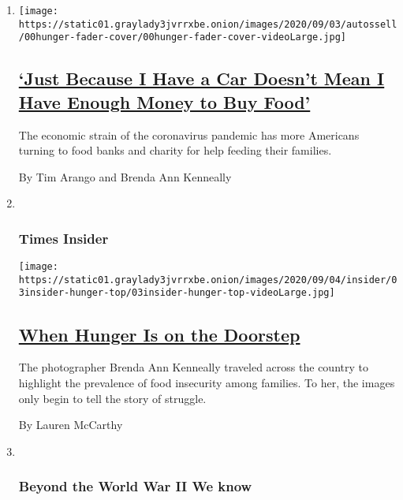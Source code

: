 \begin{enumerate}
\def\labelenumi{\arabic{enumi}.}
\item
  \texttt{[image: https://static01.graylady3jvrrxbe.onion/images/2020/09/03/autossell/00hunger-fader-cover/00hunger-fader-cover-videoLarge.jpg]}

  \hypertarget{just-because-i-have-a-car-doesnt-mean-i-have-enough-money-to-buy-food}{%
  \subsection{\texorpdfstring{\href{/2020/09/03/us/food-pantries-hunger-us.html}{`Just
  Because I Have a Car Doesn't Mean I Have Enough Money to Buy
  Food'}}{`Just Because I Have a Car Doesn't Mean I Have Enough Money to Buy Food'}}\label{just-because-i-have-a-car-doesnt-mean-i-have-enough-money-to-buy-food}}

  The economic strain of the coronavirus pandemic has more Americans
  turning to food banks and charity for help feeding their families.

  By Tim Arango and Brenda Ann Kenneally
\item ~
  \hypertarget{times-insider}{%
  \subsubsection{Times Insider}\label{times-insider}}

  \texttt{[image: https://static01.graylady3jvrrxbe.onion/images/2020/09/04/insider/03insider-hunger-top/03insider-hunger-top-videoLarge.jpg]}

  \hypertarget{when-hunger-is-on-the-doorstep}{%
  \subsection{\texorpdfstring{\href{/2020/09/02/insider/food-insecurity-families.html}{When
  Hunger Is on the
  Doorstep}}{When Hunger Is on the Doorstep}}\label{when-hunger-is-on-the-doorstep}}

  The photographer Brenda Ann Kenneally traveled across the country to
  highlight the prevalence of food insecurity among families. To her,
  the images only begin to tell the story of struggle.

  By Lauren McCarthy
\item ~
  \hypertarget{beyond-the-world-war-ii-we-know}{%
  \subsubsection{Beyond the World War II We
  know}\label{beyond-the-world-war-ii-we-know}}


\end{enumerate}
